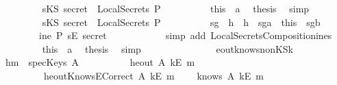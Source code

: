 \begin{isabellebody}
\ \ \ \ \ \ \ \ \isamarkupfalse%
\ {\isachardoublequoteopen}sKS\ secret\ {\isasymin}\ LocalSecrets\ P{\isachardoublequoteclose}\isanewline
\ \ \ \ \ \ \ \ \isamarkupfalse%
\ this\ \ a{}\ \isamarkupfalse%
\ {\isacharquery}thesis\ \isamarkupfalse%
\ simp\isanewline
\ \ \ \ \ \ \isamarkupfalse%
\isanewline
\ \ \ \ \ \ \ \ \isamarkupfalse%
\ {\isachardoublequoteopen}sKS\ secret\ {\isasymnotin}\ LocalSecrets\ P{\isachardoublequoteclose}\isanewline
\ \ \ \ \ \ \ \ \isamarkupfalse%
\ sg{}\ \ h{}\ \ h{}\ \ sg{}a\ \ this\ \ sg{}b\ \isamarkupfalse%
\ \isanewline
\ \ \ \ \ \ \ \ \ {\isachardoublequoteopen}ine\ P\ {\isacharparenleft}sE\ secret{\isacharparenright}{\isachardoublequoteclose}\isanewline
\ \ \ \ \ \ \ \ \ \ \isamarkupfalse%
\ {\isacharparenleft}simp\ add{\isacharcolon}\ LocalSecretsComposition{\isacharunderscore}ine{}{\isacharunderscore}s{\isacharparenright}\isanewline
\ \ \ \ \ \ \ \ \isamarkupfalse%
\ this\ \ a{}\ \isamarkupfalse%
\ {\isacharquery}thesis\ \isamarkupfalse%
\ simp\isanewline
\ \ \ \ \ \ \isamarkupfalse%
\isanewline
\ \ \ \ \isamarkupfalse%
\isanewline
\ \ \isamarkupfalse%
\isanewline
{}\isamarkupfalse%
%
\endisatagproof
{\isafoldproof}%
%
\isadelimproof
\isanewline
%
\endisadelimproof
\isanewline
{}\isamarkupfalse%
\ eout{\isacharunderscore}knows{\isacharunderscore}nonKS{\isacharunderscore}k{\isacharcolon}\isanewline
\ \ h{}{\isacharcolon}{\isachardoublequoteopen}m\ {\isasymnotin}\ {\isacharparenleft}specKeys\ A{\isacharparenright}{\isachardoublequoteclose}\isanewline
\ \ \ \ \ \ \ \ \ \ h{}{\isacharcolon}{\isachardoublequoteopen}eout\ A\ {\isacharparenleft}kE\ m{\isacharparenright}{\isachardoublequoteclose}\isanewline
\ \ \ \ \ \ \ \ \ \ h{}{\isacharcolon}{\isachardoublequoteopen}eoutKnowsECorrect\ A\ {\isacharparenleft}kE\ m{\isacharparenright}{\isachardoublequoteclose}\isanewline
\ \ \ \ {\isachardoublequoteopen}knows\ A\ {\isacharbrackleft}kE\ m{\isacharbrackright}{\isachardoublequoteclose}\isanewline
%
\isadelimproof
%
\endisadelimproof
%
\isatagproof

\end{isabellebody}
